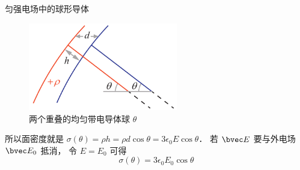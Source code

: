 \begin{exam}{匀强电场中的球形导体}
\begin{figure}[ht]
\centering
\includegraphics[width=6.5cm]{./figures/Cndctr2.pdf}
\caption{两个重叠的均匀带电导体球 $\theta$} \label{Cndctr_fig2}
\end{figure}

所以面密度就是 $\sigma(\theta) = \rho h = \rho d\cos\theta = 3\epsilon_0 E \cos\theta$． 若 $\bvec E$ 要与外电场 $\bvec E_0$ 抵消， 令 $E = E_0$ 可得
\begin{equation}
\sigma(\theta) = 3\epsilon_0 E_0 \cos\theta
\end{equation}
\end{exam}

